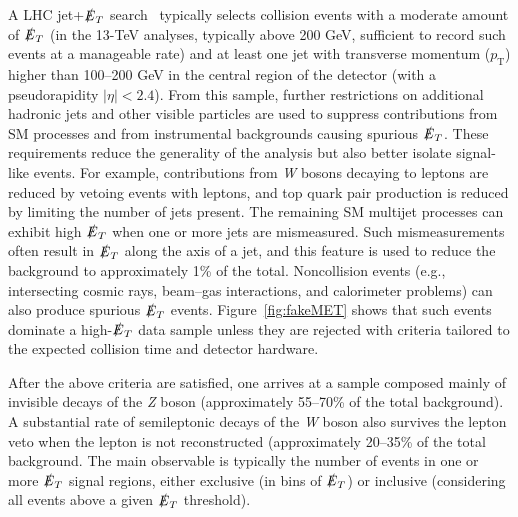 \documentclass{ar-1col}
\newcommand{\pt}{\ensuremath{p_\mathrm{T}}\xspace}
\newcommand{\MET}{\ensuremath{\slashed{E}_T}\xspace}
\begin{document}
A LHC jet+\MET search~\cite{Aaboud:2017phn,Sirunyan:2017jix}
typically selects collision events with a moderate amount of \MET
(in the 13-TeV analyses, typically above 200 GeV, sufficient to
record such events at a manageable rate) and at least one jet with
transverse momentum (\pt) higher than 100--200 GeV in the central
region of the detector (with a pseudorapidity $|\eta|<2.4$).
From this sample, further
restrictions on additional hadronic jets and other visible
particles are used to suppress contributions from SM processes and
from instrumental backgrounds causing spurious \MET. These
requirements reduce the generality of the analysis but also better
isolate signal-like events. For example, contributions from \textit{W}
bosons decaying to leptons are reduced by vetoing events with
leptons, and top quark pair production is reduced by limiting the number
of jets present. The remaining SM multijet processes can exhibit
high \MET when one or more jets are mismeasured. Such
mismeasurements often result in \MET along the axis of a jet, and
this feature is used to reduce the background to approximately 1\% of the
total. Noncollision events (e.g., intersecting cosmic rays,
beam--gas interactions, and calorimeter problems) can also produce
spurious \MET events. Figure~\ref{fig:fakeMET} shows that such
events dominate a high-\MET data sample unless they are rejected with
criteria tailored to the expected collision time and detector
hardware.

After the above criteria are satisfied, one arrives at a sample composed mainly
of invisible decays of the \textit{Z} boson (approximately 55--70\% of the
total background). A substantial rate of semileptonic decays of
the \textit{W} boson also survives the lepton veto when the lepton is not
reconstructed (approximately 20--35\% of the total background.
The main observable is typically the number of events in one or
more \MET signal regions, either exclusive (in bins of
\MET) or inclusive (considering all events above a given \MET
threshold).

\begin{marginnote}[]
\end{marginnote}
\end{document}
